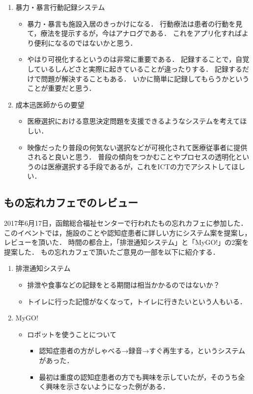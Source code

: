 \documentclass[../report]{subfiles}
\begin{document}
\begin{enumerate}
    \item[] 暴力・暴言行動記録システム
\begin{itemize}
    \item 暴力・暴言も施設入居のきっかけになる．
行動療法は患者の行動を見て，療法を提示するが，今はアナログである．
これをアプリ化すればより便利になるのではないかと思う．
    \item やはり可視化するというのは非常に重要である．
記録することで，自覚しているしんどさと実際に起きていることが違ったりする．
記録するだけで問題が解決することもある．
いかに簡単に記録してもらうかということが重要だと思う．
\end{itemize}

    \item[] 成本迅医師からの要望
\begin{itemize}
    \item 医療選択における意思決定問題を支援できるようなシステムを考えてほしい．
    \item 映像だったり普段の何気ない選択などが可視化されて医療従事者に提供されると良いと思う．
普段の傾向をつかむことやプロセスの透明化というのは医療選択する手段であるが，これをICTの力でアシストしてほしい．
\end{itemize}
\end{enumerate}

\subsection{もの忘れカフェでのレビュー} \label{sec:4_hyouka_monowasurecafe}
2017年6月17日，函館総合福祉センターで行われたもの忘れカフェに参加した．
このイベントでは，施設のことや認知症患者に詳しい方にシステム案を提案し，レビューを頂いた．
時間の都合上，「排泄通知システム」と「MyGO!」の2案を提案した．
もの忘れカフェで頂いたご意見の一部を以下に紹介する．

\begin{enumerate}
    \item[] 排泄通知システム
\begin{itemize}
    \item 排泄や食事などの記録をとる期間は相当かかるのではないか？
    \item トイレに行った記憶がなくなって，トイレに行きたいという人もいる．
\end{itemize}

    \item[] MyGO!
\begin{itemize}
    \item ロボットを使うことについて
	\begin{itemize}
		\item 認知症患者の方がしゃべる→録音→すぐ再生する，というシステムがあった．
		\item 最初は重度の認知症患者の方でも興味を示していたが，そのうち全く興味を示さないようになった例がある．
	\end{itemize}
\end{itemize}
\end{enumerate}
\end{document}
